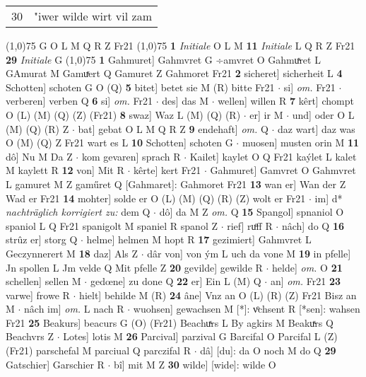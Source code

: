 \documentclass[8pt,a4paper,notitlepage]{article}
\begin{document}
\begin{table}[ht]
\begin{minipage}[t]{0.5\linewidth}
\begin{tabular}{rl}
30 & "iwer wilde wirt vil zam\\ 
\end{tabular}
\scriptsize
\line(1,0){75} \newline
G O L M Q R Z Fr21 \newline
\line(1,0){75} \newline
\textbf{1} \textit{Initiale} O L M  \textbf{11} \textit{Initiale} L Q R Z Fr21  \textbf{29} \textit{Initiale} G  \newline
\line(1,0){75} \newline
\textbf{1} Gahmuret] Gahmvret G ÷amvret O Gahmuͯret L GAmurat M Gamuͯert Q Gamuret Z Gahmoret Fr21 \textbf{2} sicheret] sicherheit L \textbf{4} Schotten] schoten G O (Q) \textbf{5} bitet] betet sie M (R) bitte Fr21  $\cdot$ si] \textit{om.} Fr21  $\cdot$ verberen] verben Q \textbf{6} si] \textit{om.} Fr21  $\cdot$ des] das M  $\cdot$ wellen] willen R \textbf{7} kêrt] chompt O (L) (M) (Q) (Z) (Fr21) \textbf{8} swaz] Waz L (M) (Q) (R)  $\cdot$ er] ir M  $\cdot$ und] oder O L (M) (Q) (R) Z  $\cdot$ bat] gebat O L M Q R Z \textbf{9} endehaft] \textit{om.} Q  $\cdot$ daz wart] daz was O (M) (Q) Z Fr21 wart es L \textbf{10} Schotten] schoten G  $\cdot$ muosen] musten orin M \textbf{11} dô] Nu M Da Z  $\cdot$ kom gevaren] sprach R  $\cdot$ Kailet] kaylet O Q Fr21 kaýlet L kalet M kaylett R \textbf{12} von] Mit R  $\cdot$ kêrte] kert Fr21  $\cdot$ Gahmuret] Gamvret O Gahmvret L gamuret M Z gaműret Q [Gahmaret]: Gahmoret Fr21 \textbf{13} wan er] Wan der Z Wad er Fr21 \textbf{14} mohter] solde er O (L) (M) (Q) (R) (Z) wolt er Fr21  $\cdot$ im] d* \textit{nachträglich korrigiert zu:} dem Q  $\cdot$ dô] da M Z \textit{om.} Q \textbf{15} Spangol] spnaniol O spaniol L Q Fr21 spanigolt M spaniel R spanol Z  $\cdot$ rief] ruͦff R  $\cdot$ nâch] do Q \textbf{16} strûz er] storg Q  $\cdot$ helme] helmen M hopt R \textbf{17} gezimiert] Gahmvret L Geczynnerert M \textbf{18} daz] Als Z  $\cdot$ dâr von] von ým L uch da vone M \textbf{19} in pfelle] Jn spollen L Jm velde Q Mit pfelle Z \textbf{20} gevilde] gewilde R  $\cdot$ helde] \textit{om.} O \textbf{21} schellen] sellen M  $\cdot$ gedœne] zu done Q \textbf{22} er] Ein L (M) Q  $\cdot$ an] \textit{om.} Fr21 \textbf{23} varwe] frowe R  $\cdot$ hielt] behilde M (R) \textbf{24} âne] Vnz an O (L) (R) (Z) Fr21 Bisz an M  $\cdot$ nâch im] \textit{om.} L nach R  $\cdot$ wuohsen] gewachsen M [*]: vͦchsent R [*sen]: wahsen Fr21 \textbf{25} Beakurs] beacurs G (O) (Fr21) Beachuͯrs L By agkirs M Beakuͯrs Q Beachvrs Z  $\cdot$ Lotes] lotis M \textbf{26} Parcival] parzival G Barcifal O Parcifal L (Z) (Fr21) parschefal M parciual Q parczifal R  $\cdot$ dâ] [du]: da O noch M do Q \textbf{29} Gatschier] Garschier R  $\cdot$ bî] mit M Z \textbf{30} wilde] [wide]: wilde O \newline

\end{minipage}
\end{table}
\end{document}
